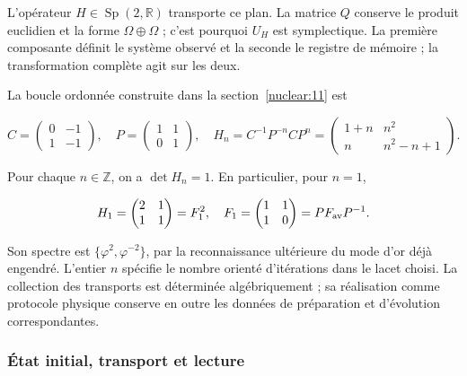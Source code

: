 L’opérateur \(H\in\operatorname{Sp}(2,\mathbb R)\) transporte ce plan. La matrice \(Q\) conserve le produit euclidien et la forme \(\Omega\oplus\Omega\) ; c’est pourquoi \(U_H\) est symplectique. La première composante définit le système observé et la seconde le registre de mémoire ; la transformation complète agit sur les deux.

La boucle ordonnée construite dans la section~\ref{nuclear:11} est



\begin{equation}
C=\begin{pmatrix}0&-1\\1&-1\end{pmatrix},\quad
P=\begin{pmatrix}1&1\\0&1\end{pmatrix},\quad
H_n=C^{-1}P^{-n}CP^n
=\begin{pmatrix}1+n&n^2\\n&n^2-n+1\end{pmatrix}.
\label{nuc12:eq:5.2}
\end{equation}



Pour chaque \(n\in\mathbb Z\), on a \(\det H_n=1\). En particulier, pour \(n=1\),


\begin{equation}
H_1=\begin{pmatrix}2&1\\1&1\end{pmatrix}
=F_1^2,\quad F_1=\begin{pmatrix}1&1\\1&0\end{pmatrix}
=P F_{\rm av}P^{-1}.
\label{nuc12:eq:5.3}
\end{equation}



Son spectre est \(\{\varphi^2,\varphi^{-2}\}\), par la reconnaissance ultérieure du mode d’or déjà engendré. L’entier \(n\) spécifie le nombre orienté d’itérations dans le lacet choisi. La collection des transports est déterminée algébriquement ; sa réalisation comme protocole physique conserve en outre les données de préparation et d’évolution correspondantes.

\subsubsection{État initial, transport et lecture}

